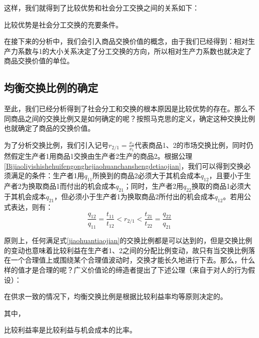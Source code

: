 这样，我们就得到了比较优势和社会分工交换之间的关系如下：

\begin{theorem}
    比较优势是社会分工交换的充要条件。
\end{theorem}

在接下来的分析中，我们会引入商品交换价值的概念，由于我们已经得到：相对生产力系数与1的大小关系决定了分工交换的方向，所以相对生产力系数也就决定了商品交换价值的单位。

\subsection{均衡交换比例的确定}

至此，我们已经分析得到了社会分工和交换的根本原因是比较优势的存在。那么不同商品之间的交换比例又是如何确定的呢？按照马克思的定义，确定这种交换比例也就确定了商品的交换价值\cite[49]{ZhongGongZhongYangMaKeSiEnGeSiLieNingSiDaLinZhuZuoBianYiJuMaKeSiEnGeSiWenJiDi5Juan2009}。

为了分析交换比例，我们引入记号$r_{2/1}=\frac{x_2}{x_1}$代表商品1、2的市场交换比例，同时仍然假定生产者1用商品1交换由生产者2生产的商品2。根据公理\ref{Bijiaoliyishishehuifengonghejiaohuanchanshengdetiaojian}，我们可以得到交换必须满足的条件：生产者1用$q_{11}$所换到的商品2必须大于其机会成本$q_{12}$，且要小于生产者2为换取商品1而付出的机会成本$q_{21}$；同时，生产者2用$q_{22}$换取的商品1必须大于其机会成本$q_{21}$，但必须小于生产者1为换取商品2所付出的机会成本$q_{12}$\cite[64]{CaiJiMingCongXiaYiJieZhiLunDaoGuangYiJieZhiLunXiuDingBan2022}。若用公式表达，则有\cite[64]{CaiJiMingCongXiaYiJieZhiLunDaoGuangYiJieZhiLunXiuDingBan2022}：
\begin{equation}
    \label{jiaohuantiaojian}
    \frac{q_{12}}{q_{11}} = \frac{t_{11}}{t_{12}} < r_{2/1} < \frac{t_{21}}{t_{22}} = \frac{q_{22}}{q_{21}}
\end{equation}

原则上，任何满足式\ref{jiaohuantiaojian}的交换比例都是可以达到的，但是交换比例的变动也意味着比较利益在生产者1、2之间的分配比例变动，故只有当交换比例落在一个合理值上或围绕某个合理值波动时，交换才能长久地进行下去。那么，什么样的值才是合理的呢？广义价值论的缔造者提出了下述公理（来自于对人的行为假设\cite[413]{LiRenJunGuangYiJieZhiLunDeLuoJiYuZhengLun2009}）：
\begin{axiom}
    在供求一致的情况下，均衡交换比例是根据比较利益率均等原则决定的\cite[65]{CaiJiMingCongXiaYiJieZhiLunDaoGuangYiJieZhiLunXiuDingBan2022}。
\end{axiom}

其中，
\begin{definition}
    比较利益率是比较利益与机会成本的比率\cite[65]{CaiJiMingCongXiaYiJieZhiLunDaoGuangYiJieZhiLunXiuDingBan2022}。
\end{definition}


